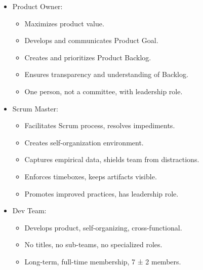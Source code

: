 \documentclass[10pt]{article}
\begin{document}
\begin{multicols}{5}
\begin{block}
    \begin{itemize}
        \item Product Owner:
        \begin{itemize}
            \item Maximizes product value.
            \item Develops and communicates Product Goal.
            \item Creates and prioritizes Product Backlog.
            \item Ensures transparency and understanding of Backlog.
            \item One person, not a committee, with leadership role.
        \end{itemize}
        \item Scrum Master:
        \begin{itemize}
            \item Facilitates Scrum process, resolves impediments.
            \item Creates self-organization environment.
            \item Captures empirical data, shields team from distractions.
            \item Enforces timeboxes, keeps artifacts visible.
            \item Promotes improved practices, has leadership role.
        \end{itemize}
        \item Dev Team:
        \begin{itemize}
            \item Develops product, self-organizing, cross-functional.
            \item No titles, no sub-teams, no specialized roles.
            \item Long-term, full-time membership, 7 ± 2 members.
        \end{itemize}
    \end{itemize}
\end{block}




\end{multicols}
\end{document}
